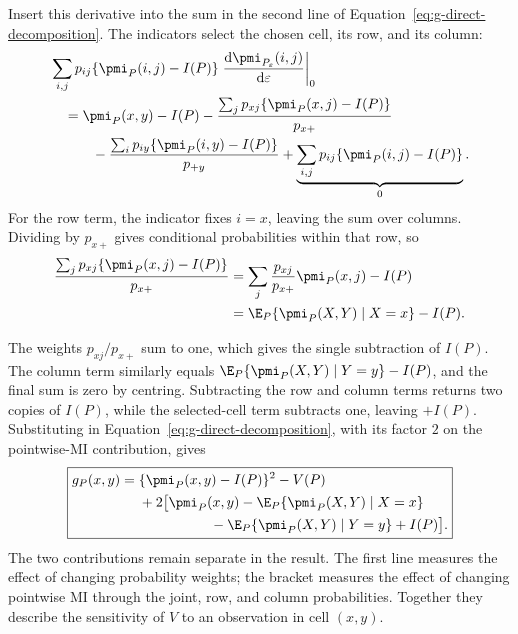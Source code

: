 Insert this derivative into the sum in the second line of
Equation~\eqref{eq:g-direct-decomposition}. The indicators select the
chosen cell, its row, and its column:
\begin{align}
  &\sum_{i,j}p_{ij}\{\pmi_P(i,j)-I(P)\}
    \left.\frac{\mathrm d\pmi_{P_\varepsilon}(i,j)}
                     {\mathrm d\varepsilon}\right|_0\notag\\
  &\quad=\pmi_P(x,y)-I(P)
    -\frac{\sum_jp_{xj}\{\pmi_P(x,j)-I(P)\}}{p_{x+}}\notag\\
  &\qquad\quad
    -\frac{\sum_ip_{iy}\{\pmi_P(i,y)-I(P)\}}{p_{+y}}
    +\underbrace{\sum_{i,j}p_{ij}\{\pmi_P(i,j)-I(P)\}}_0.
  \label{eq:centred-score-sum}
\end{align}
For the row term, the indicator fixes \(i=x\), leaving the sum over
columns. Dividing by \(p_{x+}\) gives conditional probabilities
within that row, so
\begin{align*}
  \frac{\sum_jp_{xj}\{\pmi_P(x,j)-I(P)\}}{p_{x+}}
  &=\sum_j\frac{p_{xj}}{p_{x+}}\pmi_P(x,j)-I(P)\\
  &=\E_P\{\pmi_P(X,Y)\mid X=x\}-I(P).
\end{align*}
\begin{samepage}
The weights \(p_{xj}/p_{x+}\) sum to one, which gives the single
subtraction of \(I(P)\). The column term similarly equals
\(\E_P\{\pmi_P(X,Y)\mid Y=y\}-I(P)\), and the final sum is zero
by centring. Subtracting the row and column terms returns two copies of
\(I(P)\), while the selected-cell term subtracts one, leaving
\(+I(P)\). Substituting in Equation~\eqref{eq:g-direct-decomposition},
with its factor \(2\) on the pointwise-MI contribution, gives
\begin{equation}
\boxed{
\begin{aligned}
g_P(x,y)
={}&\{\pmi_P(x,y)-I(P)\}^2-V(P)\\
&+2\bigl[
\pmi_P(x,y)
-\E_P\{\pmi_P(X,Y)\mid X=x\}\\
&\hspace{18mm}
-\E_P\{\pmi_P(X,Y)\mid Y=y\}
+I(P)
\bigr].
\end{aligned}
}
\label{eq:g-final}
\end{equation}
The two contributions remain separate in the result. The first line
measures the effect of changing probability weights; the bracket measures
the effect of changing pointwise MI through the joint, row, and column
probabilities. Together they describe the sensitivity of \(V\) to an
observation in cell \((x,y)\).
\par
\end{samepage}

